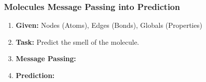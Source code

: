 \subsubsection{Molecules Message Passing into Prediction}
\begin{example}
    \begin{enumerate}
        \item \textbf{Given:} Nodes (Atoms), Edges (Bonds), Globals (Properties)
        \item \textbf{Task:} Predict the smell of the molecule. 
        \item \textbf{Message Passing:}
        \item \textbf{Prediction:}
    \end{enumerate}
\end{example}